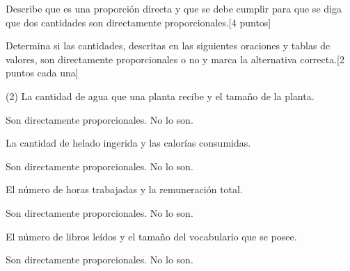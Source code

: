 \documentclass[sin curso]{plantilla-evaluacion-v1}
\begin{document}
\begin{partes}
  \parte Describe que es una proporción directa y que se debe cumplir para
  que se diga que dos cantidades son directamente proporcionales.\hfill [4 puntos]
  \begin{respuesta}[height=3.5cm]
  \end{respuesta}
  \parte Determina si las cantidades, descritas en las siguientes oraciones y 
  tablas de valores, son directamente proporcionales o no y marca la alternativa
  correcta.\hfill[2 puntos cada una]
  \begin{ejercicios}(2)
    \ejercicio La cantidad de agua que una planta recibe y el tamaño de la planta.
    \begin{vertical}
      \alternativa Son directamente proporcionales.
      \alternativa No lo son.
    \end{vertical}
    \ejercicio La cantidad de helado ingerida y las calorías consumidas.
    \begin{vertical}
      \alternativa Son directamente proporcionales.
      \alternativa No lo son.
    \end{vertical}
    \ejercicio El número de horas trabajadas y la remuneración total.
    \begin{vertical}
      \alternativa Son directamente proporcionales.
      \alternativa No lo son.
    \end{vertical}
    \ejercicio El número de libros leídos y el tamaño del vocabulario que se posee.
    \begin{vertical}
      \alternativa Son directamente proporcionales.
      \alternativa No lo son.
    \end{vertical}


\end{ejercicios}
\end{partes}
\end{document}
